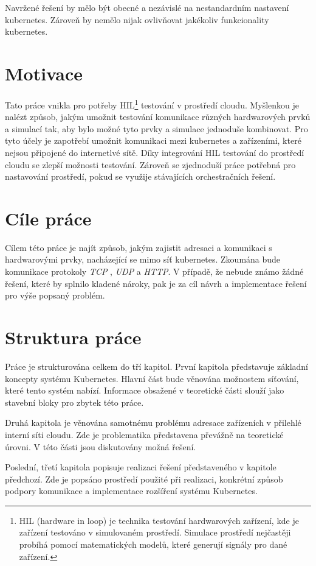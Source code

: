 Navržené řešení by mělo být obecné a nezávislé na nestandardním nastavení kubernetes. Zároveň by nemělo nijak ovlivňovat jakékoliv funkcionality kubernetes. 

\newpage

\section{Motivace}
Tato práce vnikla pro potřeby HIL\footnote{HIL (hardware in loop) je technika testování hardwarových zařízení, kde je zařízení testováno v simulovaném prostředí. Simulace prostředí nejčastěji probíhá pomocí matematických modelů, které generují signály pro dané zařízení.} testování v prostředí cloudu. Myšlenkou je nalézt způsob, jakým umožnit testování komunikace různých hardwarových prvků a simulací tak, aby bylo možné tyto prvky a simulace jednoduše kombinovat. Pro tyto účely je zapotřebí umožnit komunikaci mezi kubernetes a zařízeními, které nejsou připojené do internetlvé sítě. Díky integrování HIL testování do prostředí cloudu se zlepší možnosti testování. Zároveň se zjednoduší práce potřebná pro nastavování prostředí, pokud se využije stávajících orchestračních řešení.

\section{Cíle práce}
Cílem této práce je najít způsob, jakým zajistit adresaci a komunikaci s hardwarovými prvky, nacházející se mimo síť kubernetes. Zkoumána bude komunikace protokoly \textit{TCP} , \textit{UDP} a \textit{HTTP}. V případě, že nebude známo žádné řešení, které by splnilo kladené nároky, pak je za cíl návrh a implementace řešení pro výše popsaný problém.

\section{Struktura práce}
Práce je strukturována celkem do tří kapitol. První kapitola představuje základní koncepty systému Kubernetes. Hlavní část bude věnována možnostem síťování, které tento systém nabízí. Informace obsažené v teoretické části slouží jako stavební bloky pro zbytek této práce.

Druhá kapitola je věnována samotnému problému adresace zařízeních v přilehlé interní síti cloudu. Zde je problematika představena převážně na teoretické úrovni. V této části jsou diskutovány možná řešení.

Poslední, třetí kapitola popisuje realizaci řešení představeného v kapitole předchozí. Zde je popsáno prostředí použité při realizaci, konkrétní způsob podpory komunikace a implementace rozšíření systému Kubernetes.

